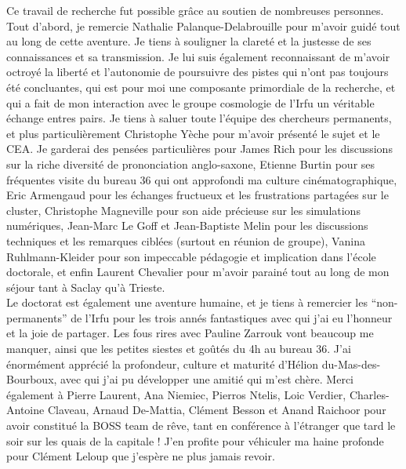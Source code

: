 \begin{intro}
{\color{purple}C}e travail de recherche fut possible gr{\^a}ce au soutien de nombreuses personnes. Tout d'abord, je remercie Nathalie Palanque-Delabrouille pour m'avoir guid\'e tout au long de cette aventure. Je tiens \`a souligner la claret\'e et la justesse de ses connaissances et sa transmission. Je lui suis \'egalement reconnaissant de m'avoir octroy\'e la libert\'e et l'autonomie de poursuivre des pistes qui n'ont pas toujours \'et\'e concluantes, qui est pour moi une composante primordiale de la recherche, et qui a fait de mon interaction avec le groupe cosmologie de l'Irfu un v\'eritable \'echange entres pairs. Je tiens à saluer toute l'\'equipe des chercheurs permanents, et plus particuli\`erement Christophe Y\`eche pour m'avoir pr\'esent\'e le sujet et le CEA. Je garderai des pens\'ees particuli\`eres pour James Rich pour les discussions sur la riche diversit\'e de prononciation anglo-saxone, Etienne Burtin pour ses fr\'equentes visite du bureau 36 qui ont approfondi ma culture cin\'ematographique, Eric Armengaud pour les \'echanges fructueux et les frustrations partag\'ees sur le cluster, Christophe Magneville pour son aide pr\'ecieuse sur les simulations num\'eriques, Jean-Marc Le Goff et Jean-Baptiste Melin pour les discussions techniques et les remarques cibl\'ees (surtout en r\'eunion de groupe), Vanina Ruhlmann-Kleider pour son impeccable p\'edagogie et implication dans l'\'ecole doctorale, et enfin Laurent Chevalier pour m'avoir parain\'e tout au long de mon s\'ejour tant \`a Saclay qu'\`a Trieste. \\

Le doctorat est \'egalement une aventure humaine, et je tiens \`a remercier les ``non-permanents'' de l'Irfu pour les trois ann\'es fantastiques avec qui j'ai eu l'honneur et la joie de partager. Les fous rires avec Pauline Zarrouk vont beaucoup me manquer, ainsi que les petites siestes et go\^ut\'es du 4h au bureau 36. J'ai \'enorm\'ement appr\'eci\'e la profondeur, culture et maturit\'e d'H\'elion du-Mas-des-Bourboux, avec qui j'ai pu d\'evelopper une amiti\'e qui m'est ch\`ere. Merci \'egalement \`a Pierre Laurent, Ana Niemiec, Pierros Ntelis, Loic Verdier, Charles-Antoine Claveau, Arnaud De-Mattia, Cl\'ement Besson et Anand Raichoor pour avoir constitu\'e la BOSS team de r\^eve, tant en conf\'erence \`a l'\'etranger que tard le soir sur les quais de la capitale ! J'en profite pour v\'ehiculer ma haine profonde pour Cl\'ement Leloup que j'esp\`ere ne plus jamais revoir. \\


\end{intro}
